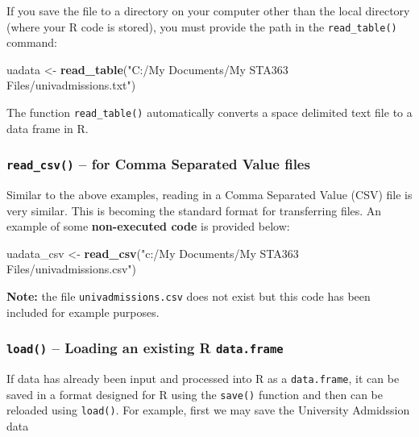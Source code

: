\documentclass[
]{book}
\newenvironment{Shaded}{\begin{snugshade}}{\end{snugshade}}
\newcommand{\FunctionTok}[1]{\textcolor[rgb]{0.13,0.29,0.53}{\textbf{#1}}}
\newcommand{\NormalTok}[1]{#1}
\newcommand{\OtherTok}[1]{\textcolor[rgb]{0.56,0.35,0.01}{#1}}
\newcommand{\StringTok}[1]{\textcolor[rgb]{0.31,0.60,0.02}{#1}}
\begin{document}
If you save the file to a directory on your computer other than the local directory (where your R code is stored), you must provide the path in the \texttt{read\_table()} command:

\begin{Shaded}
\begin{Highlighting}[]
\NormalTok{uadata }\OtherTok{\textless{}{-}} \FunctionTok{read\_table}\NormalTok{(}\StringTok{"C:/My Documents/My STA363 Files/univadmissions.txt"}\NormalTok{)}
\end{Highlighting}
\end{Shaded}

The function \texttt{read\_table()} automatically converts a space delimited text file to a data frame in R.

\hypertarget{read_csv-for-comma-separated-value-files}{%
\subsubsection{\texorpdfstring{\texttt{read\_csv()} -- for Comma Separated Value files}{read\_csv() -- for Comma Separated Value files}}\label{read_csv-for-comma-separated-value-files}}

Similar to the above examples, reading in a Comma Separated Value (CSV) file is very similar. This is becoming the standard format for transferring files. An example of some \textbf{non-executed code} is provided below:

\begin{Shaded}
\begin{Highlighting}[]
\NormalTok{uadata\_csv }\OtherTok{\textless{}{-}} \FunctionTok{read\_csv}\NormalTok{(}\StringTok{"c:/My Documents/My STA363 Files/univadmissions.csv"}\NormalTok{)}
\end{Highlighting}
\end{Shaded}

\textbf{Note:} the file \texttt{univadmissions.csv} does not exist but this code has been included for example purposes.

\hypertarget{load-loading-an-existing-r-data.frame}{%
\subsubsection{\texorpdfstring{\texttt{load()} -- Loading an existing R \texttt{data.frame}}{load() -- Loading an existing R data.frame}}\label{load-loading-an-existing-r-data.frame}}

If data has already been input and processed into R as a \texttt{data.frame}, it can be saved in a format designed for R using the \texttt{save()} function and then can be reloaded using \texttt{load()}. For example, first we may save the University Admidssion data
\end{document}

